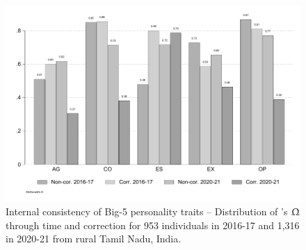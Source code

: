 \documentclass[a4paper, 11pt, onecolumn]{article}
\begin{document}
\begin{figure}[htpb]
\raggedright
\includegraphics[scale=0.8]{INPUT/omega}
\caption{Internal consistency of Big-5 personality traits -- Distribution of \citeauthor{McDonald1999}'s $\Upomega$ through time and correction for 953 individuals in 2016-17 and 1,316 in 2020-21 from rural Tamil Nadu, India.}
\label{fig:omega}
\end{figure}
\end{document}
